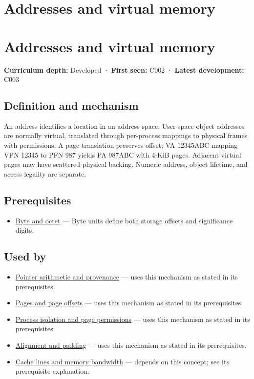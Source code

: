 \hypertarget{appendix-18ee4f913c3c}{}
\section*{Addresses and virtual memory}
\section{Addresses and virtual memory}\label{appendix-18ee4f913c3c-addresses-and-virtual-memory}

\textbf{Curriculum depth:} Developed · \textbf{First seen:} C002 · \textbf{Latest development:} C003

\subsection{Definition and mechanism}\label{appendix-18ee4f913c3c-definition-and-mechanism}

An address identifies a location in an address space. User-space object addresses are normally virtual, translated through per-process mappings to physical frames with permissions. A page translation preserves offset; VA 12345ABC mapping VPN 12345 to PFN 987 yields PA 987ABC with 4-KiB pages. Adjacent virtual pages may have scattered physical backing. Numeric address, object lifetime, and access legality are separate.

\subsection{Prerequisites}\label{appendix-18ee4f913c3c-prerequisites}

\begin{itemize}
\tightlist
\item
  \hyperref[appendix-5bee2df85484]{Byte and octet} --- Byte units define both storage offsets and significance digits.
\end{itemize}

\subsection{Used by}\label{appendix-18ee4f913c3c-used-by}

\begin{itemize}
\item
  \hyperref[appendix-6af5921bc853]{Pointer arithmetic and provenance} --- uses this mechanism as stated in its prerequisites.
\item
  \hyperref[appendix-0c67cd5bf30a]{Pages and page offsets} --- uses this mechanism as stated in its prerequisites.
\item
  \hyperref[appendix-c2a9ad1e2b49]{Process isolation and page permissions} --- uses this mechanism as stated in its prerequisites.
\item
  \hyperref[appendix-a1f7c53b4742]{Alignment and padding} --- uses this mechanism as stated in its prerequisites.
\item
  \hyperref[appendix-e4ccdbab8320]{Cache lines and memory bandwidth} --- depends on this concept; see its prerequisite explanation.
\end{itemize}

